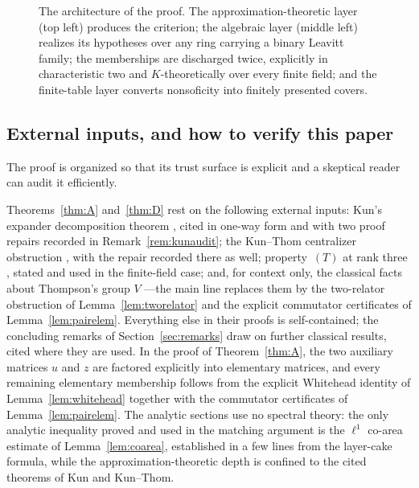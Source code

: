\documentclass[11pt]{amsart}
\theoremstyle{definition}
\theoremstyle{plain}
\begin{document}
\begin{figure}[t]
\caption{The architecture of the proof.  The approximation-theoretic layer (top left) produces the criterion; the algebraic layer (middle left) realizes its hypotheses over any ring carrying a binary Leavitt family; the memberships are discharged twice, explicitly in characteristic two and $K$-theoretically over every finite field; and the finite-table layer converts nonsoficity into finitely presented covers.}
\label{fig:architecture}
\end{figure}

\subsection*{External inputs, and how to verify this paper}

The proof is organized so that its trust surface is explicit and a skeptical reader can audit it efficiently.

Theorems~\ref{thm:A} and~\ref{thm:D} rest on the following external inputs: Kun's expander decomposition theorem \cite{Kun19}, cited in one-way form and with two proof repairs recorded in Remark~\ref{rem:kunaudit}; the Kun--Thom centralizer obstruction \cite{KunThom19}, with the repair recorded there as well; property~\((T)\) at rank three \cite{ErshovJaikin10}, stated and used in the finite-field case; and, for context only, the classical facts about Thompson's group \(V\) \cite{Higman74,CannonFloydParry96,BleakQuick17}---the main line replaces them by the two-relator obstruction of Lemma~\ref{lem:tworelator} and the explicit commutator certificates of Lemma~\ref{lem:pairelem}.  Everything else in their proofs is self-contained; the concluding remarks of Section~\ref{sec:remarks} draw on further classical results, cited where they are used.  In the proof of Theorem~\ref{thm:A}, the two auxiliary matrices \(u\) and \(z\) are factored explicitly into elementary matrices, and every remaining elementary membership follows from the explicit Whitehead identity of Lemma~\ref{lem:whitehead} together with the commutator certificates of Lemma~\ref{lem:pairelem}.  The analytic sections use no spectral theory: the only analytic inequality proved and used in the matching argument is the \(\ell^1\) co-area estimate of Lemma~\ref{lem:coarea}, established in a few lines from the layer-cake formula, while the approximation-theoretic depth is confined to the cited theorems of Kun and Kun--Thom.
\end{document}
